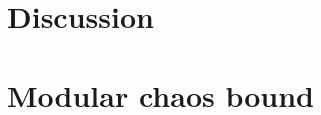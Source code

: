 \documentclass[a4paper,11pt]{article}
\theoremstyle{definition}
\newcommand{\mA}{\mathcal{A}}
\newcommand{\mB}{\mathcal{B}}
\begin{document}













\section{Discussion}

\section{Modular chaos bound}
\end{document}
